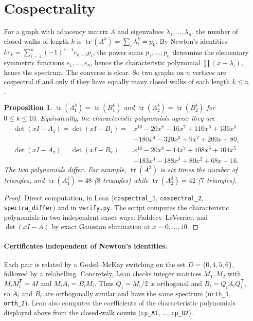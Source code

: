 \documentclass[11pt]{article}
\newtheorem{proposition}[theorem]{Proposition}
\theoremstyle{remark}
\begin{document}
\section{Cospectrality}
For a graph with adjacency matrix $A$ and eigenvalues
$\lambda_1,\dots,\lambda_n$, the number of closed walks of length $k$ is
$\operatorname{tr}(A^k)=\sum_i\lambda_i^k=p_k$. By Newton's identities
$ke_k=\sum_{i=1}^k(-1)^{i-1}e_{k-i}p_i$, the power sums $p_1,\dots,p_n$
determine the elementary symmetric functions $e_1,\dots,e_n$, hence the
characteristic polynomial $\prod(x-\lambda_i)$, hence the spectrum. The
converse is clear. So two graphs on $n$ vertices are cospectral if and only if
they have equally many closed walks of each length $k\le n$.

\begin{proposition}
$\operatorname{tr}(A_1^k)=\operatorname{tr}(B_1^k)$ and
$\operatorname{tr}(A_2^k)=\operatorname{tr}(B_2^k)$ for $0\le k\le10$. Equivalently, the
characteristic polynomials agree; they are
\begin{align*}
\det(xI-A_1)=\det(xI-B_1)={}&x^{10}-20x^8-16x^7+110x^6+136x^5\\&-180x^4-320x^3+9x^2+200x+80,\\
\det(xI-A_2)=\det(xI-B_2)={}&x^{10}-20x^8-14x^7+108x^6+104x^5\\&-183x^4-188x^3+80x^2+68x-16.
\end{align*}
The two polynomials differ. For example, $\operatorname{tr}(A^3)$ is six times the
number of triangles, and $\operatorname{tr}(A_1^3)=48$ ($8$ triangles) while
$\operatorname{tr}(A_2^3)=42$ ($7$ triangles).
\end{proposition}
\begin{proof}
Direct computation, in Lean (\texttt{cospectral\_1}, \texttt{cospectral\_2},
\texttt{spectra\_differ}) and in \texttt{verify.py}. The script computes the
characteristic polynomials in two independent exact ways: Faddeev--LeVerrier,
and $\det(xI-A)$ by exact Gaussian elimination at $x=0,\dots,10$.
\end{proof}

\paragraph{Certificates independent of Newton's identities.} Each pair is
related by a Godsil--McKay switching \cite{bh} on the set $D=\{0,4,5,6\}$,
followed by a relabelling. Concretely, Lean checks integer matrices $M_1,M_2$
with $M_iM_i^{\mathsf T}=4I$ and $M_iA_i=B_iM_i$. Thus $Q_i=M_i/2$ is orthogonal and
$B_i=Q_iA_iQ_i^{\mathsf T}$, so $A_i$ and $B_i$ are orthogonally similar and have the
same spectrum (\texttt{orth\_1}, \texttt{orth\_2}). Lean also computes the
coefficients of the characteristic polynomials displayed above from the
closed-walk counts (\texttt{cp\_A1}, \dots, \texttt{cp\_B2}).
\end{document}

